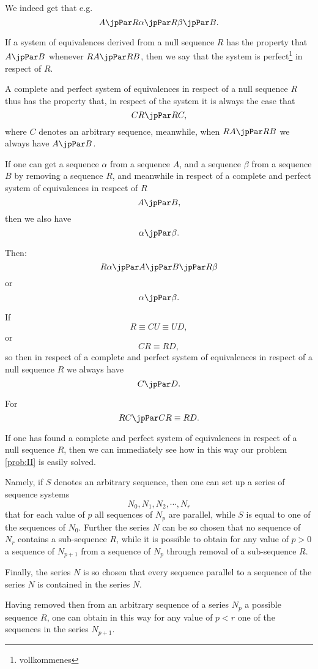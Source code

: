 We indeed get that e.g.
$$A \jpPar R\alpha \jpPar R\beta \jpPar B.$$

\bigskip

If a system of equivalences derived from a null sequence $R$ has the
property that $A \jpPar B$ whenever $RA \jpPar RB$, then we say that
the system is perfect\footnote{vollkommenes} in respect of $R$.

A complete and perfect system of equivalences in respect of a
null sequence $R$ thus has the property that, in respect of the system
it is always the case that
$$CR \jpPar RC,$$
where $C$ denotes an arbitrary sequence, meanwhile, when
$RA \jpPar RB$ we always have $A \jpPar B$.

If one can get a sequence $\alpha$ from a sequence $A$, and a sequence
$\beta$ from a sequence $B$ by removing a sequence $R$, and meanwhile
in respect of a complete and perfect system of equivalences in respect
of $R$
$$A \jpPar B,$$
then we also have
$$\alpha \jpPar \beta.$$

Then:
$$R\alpha \jpPar A  \jpPar B \jpPar R\beta$$
or
$$\alpha \jpPar \beta.$$


\bigskip

If
$$R \equiv CU \equiv UD,$$
or
$$CR \equiv RD,$$
so then in respect of a complete and perfect system of equivalences in respect
of a null sequence  $R$ we always have 
$$C \jpPar D.$$

For
$$RC \jpPar CR \equiv RD.$$

\bigskip


If one has found a complete and perfect system of equivalences in respect
of a null sequence  $R$, then we can immediately see how in this way
our problem \ref{prob:II} is easily solved.

Namely, if $S$ denotes an arbitrary sequence, then one can set up a
series of sequence systems
$$N_0, N_1, N_2, \cdots, N_r$$
that for each value of $p$ all sequences of $N_p$ are parallel, while
$S$ is equal to one of the sequences of $N_0$.  Further the series $N$
can be so chosen that no sequence of $N_r$ contains a sub-sequence $R$,
while it is possible to obtain for any value of $p>0$ a sequence of
$N_{p+1}$ from a sequence of $N_p$ through removal of a sub-sequence
$R$.

Finally, the series $N$ is so chosen that every sequence parallel to a
sequence of the series $N$ is contained in the series $N$.

Having removed then from an arbitrary sequence of a series $N_p$ a
possible sequence $R$, one can obtain in this way for any value of $p
< r$ one of the sequences in the series $N_{p+1}$.

